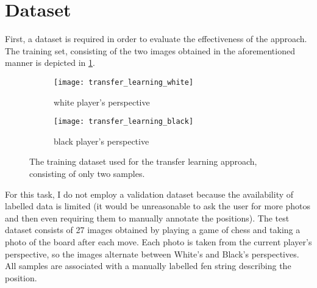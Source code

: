 \documentclass[../report.tex]{subfiles}
\begin{document}
\section{Dataset}
First, a dataset is required in order to evaluate the effectiveness of the approach.
The training set, consisting of the two images obtained in the aforementioned manner is depicted in \cref{fig:transfer_learning_train_data}.
\begin{figure}
    \centering
    \begin{subfigure}[b]{0.47\textwidth}
        \centering
        \texttt{[image: transfer\_learning\_white]}
        \caption{white player's perspective}
    \end{subfigure}
    \hfill
    \begin{subfigure}[b]{0.47\textwidth}
        \centering
        \texttt{[image: transfer\_learning\_black]}
        \caption{black player's perspective}
    \end{subfigure}
    \caption{The training dataset used for the transfer learning approach, consisting of only two samples.}
    \label{fig:transfer_learning_train_data}
\end{figure}
For this task, I do not employ a validation dataset because the availability of labelled data is limited (it would be unreasonable to ask the user for more photos and then even requiring them to manually annotate the positions).
The test dataset consists of 27 images obtained by playing a game of chess and taking a photo of the board after each move.
Each photo is taken from the current player's perspective, so the images alternate between White's and Black's perspectives.
All samples are associated with a manually labelled \gls{fen} string describing the position.
\end{document}
